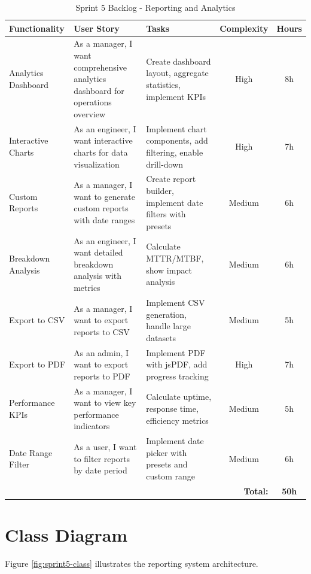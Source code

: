 \begin{table}[H]
\centering
\scriptsize
\caption{Sprint 5 Backlog - Reporting and Analytics}
\label{tab:sprint5-backlog}
\begin{tabular}{|p{2.8cm}|p{4cm}|p{5cm}|c|c|}
\hline
\textbf{Functionality} & \textbf{User Story} & \textbf{Tasks} & \textbf{Complexity} & \textbf{Hours} \\
\hline
Analytics Dashboard & As a manager, I want comprehensive analytics dashboard for operations overview & Create dashboard layout, aggregate statistics, implement KPIs & High & 8h \\
\hline
Interactive Charts & As an engineer, I want interactive charts for data visualization & Implement chart components, add filtering, enable drill-down & High & 7h \\
\hline
Custom Reports & As a manager, I want to generate custom reports with date ranges & Create report builder, implement date filters with presets & Medium & 6h \\
\hline
Breakdown Analysis & As an engineer, I want detailed breakdown analysis with metrics & Calculate MTTR/MTBF, show impact analysis & Medium & 6h \\
\hline
Export to CSV & As a manager, I want to export reports to CSV & Implement CSV generation, handle large datasets & Medium & 5h \\
\hline
Export to PDF & As an admin, I want to export reports to PDF & Implement PDF with jsPDF, add progress tracking & High & 7h \\
\hline
Performance KPIs & As a manager, I want to view key performance indicators & Calculate uptime, response time, efficiency metrics & Medium & 5h \\
\hline
Date Range Filter & As a user, I want to filter reports by date period & Implement date picker with presets and custom range & Medium & 6h \\
\hline
\multicolumn{4}{|r|}{\textbf{Total:}} & \textbf{50h} \\
\hline
\end{tabular}
\end{table}

\section{Class Diagram}

Figure \ref{fig:sprint5-class} illustrates the reporting system architecture.

